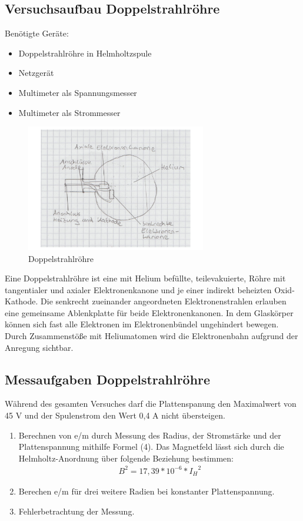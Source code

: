 \documentclass[a4paper,10pt]{scrartcl}
\begin{document}
	\subsection{Versuchsaufbau Doppelstrahlröhre}
	Benötigte Geräte:
	\begin{itemize}
\item Doppelstrahlröhre in Helmholtzspule
\item Netzgerät
\item Multimeter als Spannungsmesser
\item Multimeter als Strommesser
\end{itemize}
\begin{figure}[h]
\centering
\includegraphics[width=0.7\textwidth]{./Bilder/emdoppel}
\caption{Doppelstrahlröhre}
\end{figure}
Eine Doppelstrahlröhre ist eine mit Helium befüllte, teilevakuierte, Röhre mit tangentialer und axialer Elektronenkanone und je einer indirekt beheizten Oxid-Kathode. Die senkrecht zueinander
angeordneten Elektronenstrahlen erlauben eine gemeinsame Ablenkplatte für beide Elektronenkanonen. In dem Glaskörper können sich fast alle Elektronen im Elektronenbündel ungehindert bewegen. 
Durch Zusammenstöße mit Heliumatomen wird die Elektronenbahn aufgrund der Anregung sichtbar.

\FloatBarrier
	\subsection{Messaufgaben Doppelstrahlröhre}
Während des gesamten Versuches darf die Plattenspanung den Maximalwert von 45 V und der Spulenstrom den Wert 0,4 A nicht übersteigen.
	 \begin{enumerate}
	 \item Berechnen von e/m durch Messung des Radius, der Stromstärke und der Plattenspannung mithilfe Formel (4).
	 Das
Magnetfeld lässt sich durch die Helmholtz-Anordnung über folgende Beziehung bestimmen:
\begin{align*}
B^2=17,39*10^{-6}*{I_H}^2
\end{align*}
	 \item Berechen e/m für drei weitere Radien bei konstanter Plattenspannung.
	 \item Fehlerbetrachtung der Messung.
	 \end{enumerate}
	
    
	
	
	
	
	
\end{document}
